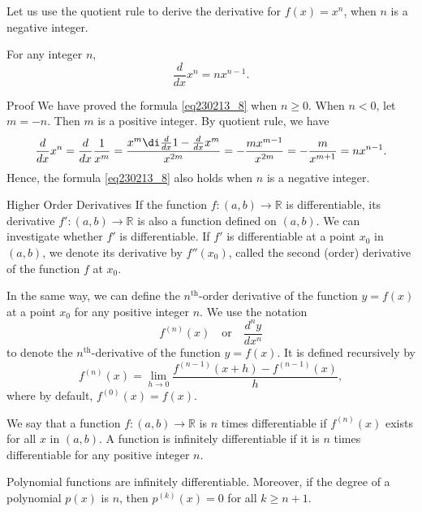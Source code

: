 Let us use the quotient rule to derive the derivative for $f(x)=x^n$, when $n$ is a negative integer. 

\begin{proposition}[label=prop230215_1]{}
For any integer $n$,
\begin{equation}\label{eq230213_8}\frac{d}{dx}x^n =nx^{n-1}.\end{equation}

\end{proposition}
\begin{myproof}{Proof}
We have proved the formula   \eqref{eq230213_8} when $n\geq 0$. When $n<0$, let $m=-n$. Then $m$ is a positive integer.  
By quotient rule, we have
\[\frac{d}{dx}x^n=\frac{d}{dx}\frac{1}{x^m}=\frac{x^m \di \frac{d}{dx} 1- \frac{d}{dx}x^m}{x^{2m}}=-\frac{mx^{m-1}}{x^{2m}}=-\frac{m}{x^{m+1}}=nx^{n-1}.\]
Hence, the formula \eqref{eq230213_8} also holds when $n$ is a negative integer.  
\end{myproof}

\begin{definition}{Higher Order Derivatives}
If the function $f:(a,b)\to\mathbb{R}$ is differentiable, its derivative $f':(a,b)\to\mathbb{R}$ is also a function  defined on $(a, b)$. We can investigate whether $f'$ is differentiable. If $f'$ is differentiable at a point $x_0$ in $(a, b)$, we denote its derivative by $f''(x_0)$, called the second (order) derivative of the function $f$ at $x_0$. 

In the same way, we can define the $n^{\text{th}}$-order derivative of the function $y=f(x)$ at  a point $x_0$ for any positive integer $n$. We use the notation \[f^{(n)}(x)\quad\text{or}\quad\frac{d^n y}{dx^n}\] to denote the $n^{\text{th}}$-derivative of the function $y=f(x)$. It is defined recursively by
\[f^{(n)}(x)=\lim_{h\to 0}\frac{f^{(n-1)}(x+h)-f^{(n-1)}(x)}{h},\]
where by default, $f^{(0)}(x)=f(x)$.

We say that a function $f:(a,b)\rightarrow\mathbb{R}$ is $n$ times differentiable if $f^{(n)}(x)$ exists for all $x$ in $(a,b)$. A function is infinitely differentiable if it is $n$ times differentiable for any positive integer $n$.
\end{definition}

\begin{example}{}
Polynomial functions are infinitely differentiable. Moreover, if the degree of a polynomial $p(x)$ is  $n$, then
$p^{(k)}(x)=0$ for all $k\geq n+1$.
\end{example}

